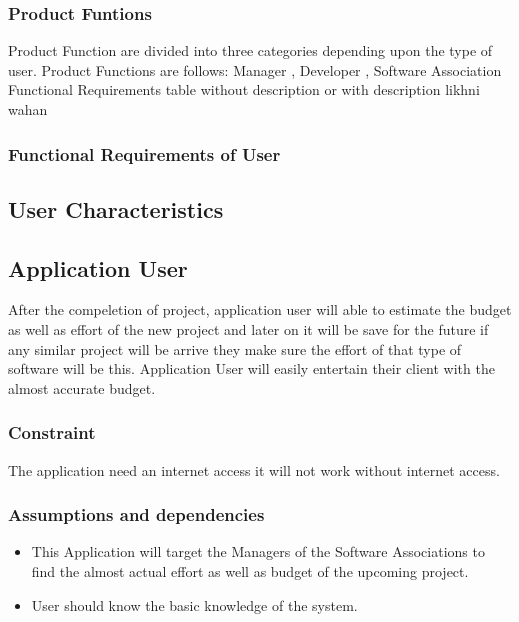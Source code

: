 \subsubsection{Product Funtions}
    Product Function are divided into three categories depending upon the type of user. Product Functions are follows:
    Manager , Developer , Software Association
    \\{\huge Functional Requirements table without description  or with description likhni wahan  \\ }
    \subsubsection{Functional Requirements of User}
    


\subsection{User Characteristics}
\subsection*{Application User}
After the compeletion of project, application user will able to estimate the budget as well as effort of the new project and later on it will be save for the future if any similar project will be arrive they make sure the effort of that type of software will be this.
Application User will easily entertain their client with the almost accurate budget. 
\subsubsection{Constraint}
The application need an internet access it will not work without internet access.
\subsubsection{Assumptions and dependencies}
\begin{center}
    \begin{itemize}
        \item This Application will target the Managers of the Software Associations to find the almost actual effort as well as budget of the upcoming project.
        \item User should know the basic knowledge of the system.
    \end{itemize}
\end{center}
